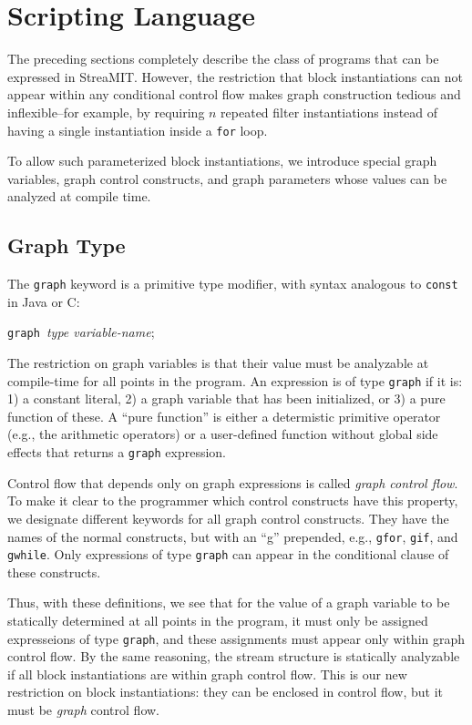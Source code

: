 \section{Scripting Language}
\label{sec:script}

The preceding sections completely describe the class of programs that
can be expressed in StreaMIT.  However, the restriction that block
instantiations can not appear within any conditional control flow
makes graph construction tedious and inflexible--for example, by
requiring $n$ repeated filter instantiations instead of having a
single instantiation inside a {\tt for} loop.

To allow such parameterized block instantiations, we introduce special
graph variables, graph control constructs, and graph parameters
whose values can be analyzed at compile time.

\subsection{Graph Type}

The {\tt graph} keyword is a primitive type modifier, with syntax
analogous to {\tt const} in Java or C:

\medskip
{\tt graph }{\it type variable-name};
\medskip

The restriction on graph variables is that their value must be
analyzable at compile-time for all points in the program.  An
expression is of type {\tt graph} if it is: 1) a constant literal, 2)
a graph variable that has been initialized, or 3) a pure function of
these.  A ``pure function'' is either a determistic primitive operator
(e.g., the arithmetic operators) or a user-defined function without
global side effects that returns a {\tt graph} expression.

Control flow that depends only on graph expressions is called {\it
graph control flow}.  To make it clear to the programmer which
control constructs have this property, we designate different keywords
for all graph control constructs.  They have the names of the normal
constructs, but with an ``g'' prepended, e.g., {\tt gfor}, {\tt gif},
and {\tt gwhile}.  Only expressions of type {\tt graph} can appear in
the conditional clause of these constructs.

Thus, with these definitions, we see that for the value of a graph
variable to be statically determined at all points in the program, it
must only be assigned expresseions of type {\tt graph}, and these
assignments must appear only within graph control flow.  By the same
reasoning, the stream structure is statically analyzable if all block
instantiations are within graph control flow.  This is our new
restriction on block instantiations: they can be enclosed in control
flow, but it must be {\it graph} control flow.

